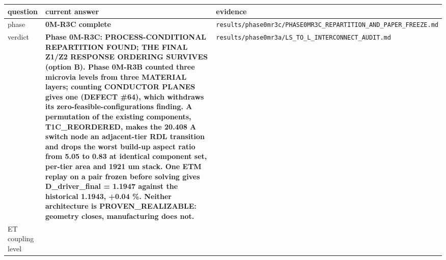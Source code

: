 \documentclass[10pt,]{article}
\begin{document}
\begin{longtable}[]{@{}lll@{}}
\toprule
\begin{minipage}[b]{0.30\columnwidth}\raggedright
question\strut
\end{minipage} & \begin{minipage}[b]{0.30\columnwidth}\raggedright
current answer\strut
\end{minipage} & \begin{minipage}[b]{0.30\columnwidth}\raggedright
evidence\strut
\end{minipage}\tabularnewline
\midrule
\endhead
\begin{minipage}[t]{0.30\columnwidth}\raggedright
phase\strut
\end{minipage} & \begin{minipage}[t]{0.30\columnwidth}\raggedright
\textbf{0M-R3C complete}\strut
\end{minipage} & \begin{minipage}[t]{0.30\columnwidth}\raggedright
\texttt{results/phase0mr3c/PHASE0MR3C\_REPARTITION\_AND\_PAPER\_FREEZE.md}\strut
\end{minipage}\tabularnewline
\begin{minipage}[t]{0.30\columnwidth}\raggedright
verdict\strut
\end{minipage} & \begin{minipage}[t]{0.30\columnwidth}\raggedright
\textbf{Phase 0M-R3C: PROCESS-CONDITIONAL REPARTITION FOUND; THE FINAL
Z1/Z2 RESPONSE ORDERING SURVIVES (option B). Phase 0M-R3B counted three
microvia levels from three MATERIAL layers; counting CONDUCTOR PLANES
gives one (DEFECT \#64), which withdraws its
zero-feasible-configurations finding. A permutation of the existing
components, T1C\_REORDERED, makes the 20.408 A switch node an
adjacent-tier RDL transition and drops the worst build-up aspect ratio
from 5.05 to 0.83 at identical component set, per-tier area and 1921 um
stack. One ETM replay on a pair frozen before solving gives
D\_driver\_final = 1.1947 against the historical 1.1943, +0.04 \%.
Neither architecture is PROVEN\_REALIZABLE: geometry closes,
manufacturing does not.}\strut
\end{minipage} & \begin{minipage}[t]{0.30\columnwidth}\raggedright
\texttt{results/phase0mr3a/LS\_TO\_L\_INTERCONNECT\_AUDIT.md}\strut
\end{minipage}\tabularnewline
\begin{minipage}[t]{0.30\columnwidth}\raggedright
ET coupling level\strut
\end{minipage} & \begin{minipage}[t]{0.30\columnwidth}\raggedright

\end{minipage}
\end{longtable}
\end{document}
